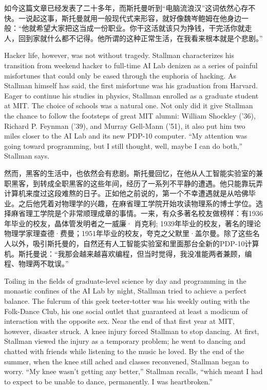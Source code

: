 \ifdefined\chs
如今这篇文章已经发表了二十多年，而斯托曼听到``电脑流浪汉''这词依然心存不快。一说起这事，斯托曼就用一般现代式来形容，就好像魏岑鲍姆在他身边一般：``他就希望大家把这当成一份职业。你干这活就该只为挣钱，干完活你就走人，回到家就什么都不记得。他所谓的这种正常生活，在我看来根本就是个悲剧。''
\fi

\ifdefined\eng
Hacker life, however, was not without tragedy. Stallman characterizes his transition from weekend hacker to full-time AI Lab denizen as a series of painful misfortunes that could only be eased through the euphoria of hacking. As Stallman himself has said, the first misfortune was his graduation from Harvard. Eager to continue his studies in physics, Stallman enrolled as a graduate student at MIT. The choice of schools was a natural one. Not only did it give Stallman the chance to follow the footsteps of great MIT alumni: William Shockley ('36), Richard P. Feynman ('39), and Murray Gell-Mann ('51), it also put him two miles closer to the AI Lab and its new PDP-10 computer. ``My attention was going toward programming, but I still thought, well, maybe I can do both,'' Stallman says.
\fi

\ifdefined\chs
然而，黑客的生活中，也依然会有悲剧。斯托曼回忆，在他从人工智能实验室的兼职黑客，到转成全职黑客的这些年间，经历了一系列不平静的遭遇。他只能靠玩弄计算机来度过这段难熬的日子。正如他之前说的，第一个不幸遭遇就是从哈佛毕业。之后他凭着对物理学的兴趣，在麻省理工学院开始攻读物理系的博士学位。选择麻省理工学院是个非常顺理成章的事情。一来，有众多著名校友做榜样：有1936年毕业的校友，晶体管发明者之一威廉· 肖克利; 1939年毕业的校友，著名的理论物理学家理查德·费曼；1951年毕业的校友，夸克之父默里·盖尔曼。除了这些名人以外，吸引斯托曼的，自然还有人工智能实验室和里面那台全新的PDP-10计算机。斯托曼说：``我那会越来越喜欢编程，但当时觉得，我没准能两者兼顾，编程、物理两不耽误。''
\fi

\ifdefined\eng
Toiling in the fields of graduate-level science by day and programming in the monastic confines of the AI Lab by night, Stallman tried to achieve a perfect balance. The fulcrum of this geek teeter-totter was his weekly outing with the Folk-Dance Club, his one social outlet that guaranteed at least a modicum of interaction with the opposite sex. Near the end of that first year at MIT, however, disaster struck. A knee injury forced Stallman to stop dancing. At first, Stallman viewed the injury as a temporary problem; he went to dancing and chatted with friends while listening to the music he loved. By the end of the summer, when the knee still ached and classes reconvened, Stallman began to worry. ``My knee wasn't getting any better,'' Stallman recalls, ``which meant I had to expect to be unable to dance, permanently. I was heartbroken.''
\fi

